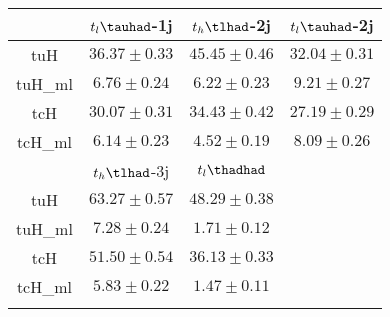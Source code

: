 \centering
\begin{tabular}{cccc} \toprule\toprule
 & $t_l\tauhad$-1j & $t_h\tlhad$-2j & $t_l\tauhad$-2j  \\\midrule
tuH & $36.37\pm0.33$ & $45.45\pm0.46$ & $32.04\pm0.31$\\
tuH\_ml & $6.76\pm0.24$ & $6.22\pm0.23$ & $9.21\pm0.27$\\
tcH & $30.07\pm0.31$ & $34.43\pm0.42$ & $27.19\pm0.29$\\
tcH\_ml & $6.14\pm0.23$ & $4.52\pm0.19$ & $8.09\pm0.26$\\ \toprule\toprule
&$t_h\tlhad$-3j &$t_l\thadhad$  \\\midrule
tuH & $63.27\pm0.57$ & $48.29\pm0.38$\\
tuH\_ml & $7.28\pm0.24$ & $1.71\pm0.12$\\
tcH & $51.50\pm0.54$ & $36.13\pm0.33$\\
tcH\_ml & $5.83\pm0.22$ & $1.47\pm0.11$\\
\bottomrule\bottomrule\\
\end{tabular}

